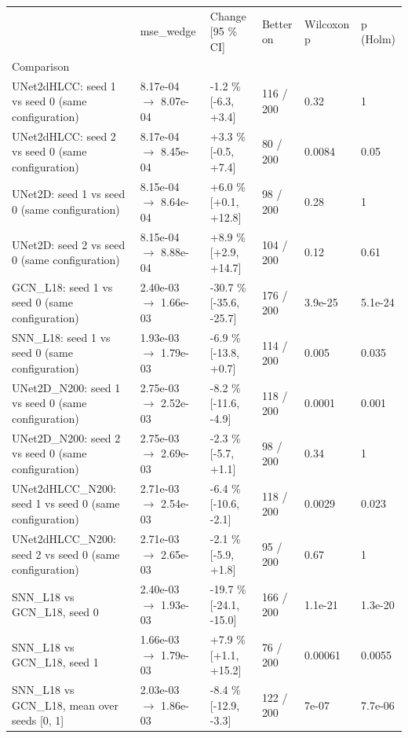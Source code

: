 \begin{tabular}{llllll}
\toprule
 & mse\_wedge & Change [95 \% CI] & Better on & Wilcoxon p & p (Holm) \\
Comparison &  &  &  &  &  \\
\midrule
UNet2dHLCC: seed 1 vs seed 0 (same configuration) & 8.17e-04 $\rightarrow$ 8.07e-04 & -1.2 \% [-6.3, +3.4] & 116 / 200 & 0.32 & 1 \\
UNet2dHLCC: seed 2 vs seed 0 (same configuration) & 8.17e-04 $\rightarrow$ 8.45e-04 & +3.3 \% [-0.5, +7.4] & 80 / 200 & 0.0084 & 0.05 \\
UNet2D: seed 1 vs seed 0 (same configuration) & 8.15e-04 $\rightarrow$ 8.64e-04 & +6.0 \% [+0.1, +12.8] & 98 / 200 & 0.28 & 1 \\
UNet2D: seed 2 vs seed 0 (same configuration) & 8.15e-04 $\rightarrow$ 8.88e-04 & +8.9 \% [+2.9, +14.7] & 104 / 200 & 0.12 & 0.61 \\
GCN\_L18: seed 1 vs seed 0 (same configuration) & 2.40e-03 $\rightarrow$ 1.66e-03 & -30.7 \% [-35.6, -25.7] & 176 / 200 & 3.9e-25 & 5.1e-24 \\
SNN\_L18: seed 1 vs seed 0 (same configuration) & 1.93e-03 $\rightarrow$ 1.79e-03 & -6.9 \% [-13.8, +0.7] & 114 / 200 & 0.005 & 0.035 \\
UNet2D\_N200: seed 1 vs seed 0 (same configuration) & 2.75e-03 $\rightarrow$ 2.52e-03 & -8.2 \% [-11.6, -4.9] & 118 / 200 & 0.0001 & 0.001 \\
UNet2D\_N200: seed 2 vs seed 0 (same configuration) & 2.75e-03 $\rightarrow$ 2.69e-03 & -2.3 \% [-5.7, +1.1] & 98 / 200 & 0.34 & 1 \\
UNet2dHLCC\_N200: seed 1 vs seed 0 (same configuration) & 2.71e-03 $\rightarrow$ 2.54e-03 & -6.4 \% [-10.6, -2.1] & 118 / 200 & 0.0029 & 0.023 \\
UNet2dHLCC\_N200: seed 2 vs seed 0 (same configuration) & 2.71e-03 $\rightarrow$ 2.65e-03 & -2.1 \% [-5.9, +1.8] & 95 / 200 & 0.67 & 1 \\
SNN\_L18 vs GCN\_L18, seed 0 & 2.40e-03 $\rightarrow$ 1.93e-03 & -19.7 \% [-24.1, -15.0] & 166 / 200 & 1.1e-21 & 1.3e-20 \\
SNN\_L18 vs GCN\_L18, seed 1 & 1.66e-03 $\rightarrow$ 1.79e-03 & +7.9 \% [+1.1, +15.2] & 76 / 200 & 0.00061 & 0.0055 \\
SNN\_L18 vs GCN\_L18, mean over seeds [0, 1] & 2.03e-03 $\rightarrow$ 1.86e-03 & -8.4 \% [-12.9, -3.3] & 122 / 200 & 7e-07 & 7.7e-06 \\
\bottomrule
\end{tabular}
